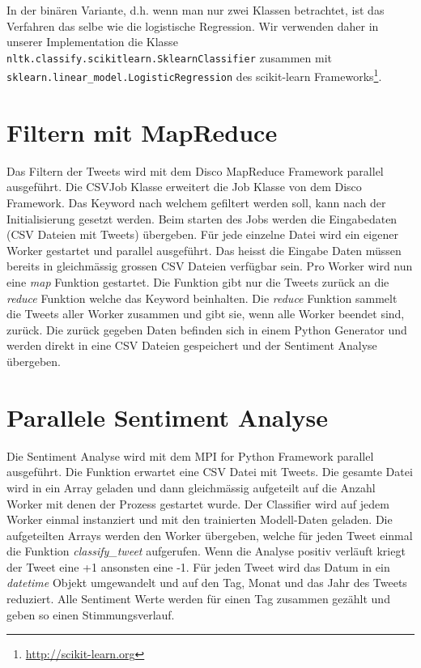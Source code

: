 \documentclass[12pt, oneside]{report}   	%
\begin{document}
In der binären Variante, d.h. wenn man nur zwei Klassen betrachtet, ist das Verfahren das selbe wie die logistische Regression. Wir verwenden daher in unserer Implementation die Klasse
\verb|nltk.classify.scikitlearn.SklearnClassifier| zusammen mit
\verb|sklearn.linear_model.LogisticRegression| des scikit-learn Frameworks\footnote{\url{http://scikit-learn.org}}.



\section{Filtern mit MapReduce}
Das Filtern der Tweets wird mit dem Disco MapReduce Framework parallel ausgeführt. Die CSVJob Klasse erweitert die Job Klasse von dem Disco Framework. Das Keyword nach welchem gefiltert werden soll, kann nach der Initialisierung gesetzt werden. Beim starten des Jobs werden die Eingabedaten (CSV Dateien mit Tweets) übergeben. Für jede einzelne Datei wird ein eigener Worker gestartet und parallel ausgeführt. Das heisst die Eingabe Daten müssen bereits in gleichmässig grossen CSV Dateien verfügbar sein. Pro Worker wird nun eine \emph{map} Funktion gestartet. Die Funktion gibt nur die Tweets zurück an die \emph{reduce} Funktion welche das Keyword beinhalten. Die \emph{reduce} Funktion sammelt die Tweets aller Worker zusammen und gibt sie, wenn alle Worker beendet sind, zurück. Die zurück gegeben Daten befinden sich in einem Python Generator und werden direkt in eine CSV Dateien gespeichert und der Sentiment Analyse übergeben.

\section{Parallele Sentiment Analyse}
Die Sentiment Analyse wird mit dem MPI for Python Framework parallel ausgeführt. Die Funktion erwartet eine CSV Datei mit Tweets. Die gesamte Datei wird in ein Array geladen und dann gleichmässig aufgeteilt auf die Anzahl Worker mit denen der Prozess gestartet wurde. 
Der Classifier wird auf jedem Worker einmal instanziert und mit den trainierten Modell-Daten geladen. 
Die aufgeteilten Arrays werden den Worker übergeben, welche für jeden Tweet einmal die Funktion \emph{classify\_tweet} aufgerufen. Wenn die Analyse positiv verläuft kriegt der Tweet eine +1 ansonsten eine -1. \newline{} 
%
Für jeden Tweet wird das Datum in ein \emph{datetime} Objekt umgewandelt und auf den Tag, Monat und das Jahr des Tweets reduziert. Alle Sentiment Werte werden für einen Tag zusammen gezählt und geben so einen Stimmungsverlauf.
\end{document}
